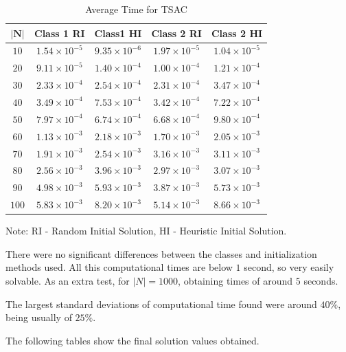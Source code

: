\documentclass[a4paper,12pt]{article}
\begin{document}
		
	\begin{table}[H]
		\centering
		\begin{tabular}{c|c|c|c|c}
			$ \mathbf{|N|}$ & \textbf{Class 1 RI}  & \textbf{Class1 HI}& \textbf{Class 2 RI} & \textbf{Class 2 HI}  \\ \hline
			$ 10  $			& $1.54\times10^{-5}$ & $9.35\times10^{-6}$& $1.97\times10^{-5}$ & $1.04\times10^{-5}$ \\ \hline
			$ 20  $			& $9.11\times10^{-5}$ & $1.40\times10^{-4}$& $1.00\times10^{-4}$ & $1.21\times10^{-4}$ \\ \hline
			$ 30  $			& $2.33\times10^{-4}$ & $2.54\times10^{-4}$& $2.31\times10^{-4}$ & $3.47\times10^{-4}$ \\ \hline
			$ 40  $			& $3.49\times10^{-4}$ & $7.53\times10^{-4}$& $3.42\times10^{-4}$ & $7.22\times10^{-4}$\\ \hline
			$ 50  $			& $7.97\times10^{-4}$ & $6.74\times10^{-4}$& $6.68\times10^{-4}$ & $9.80\times10^{-4}$ \\ \hline
			$ 60  $			& $1.13\times10^{-3}$ & $2.18\times10^{-3}$& $1.70\times10^{-3}$ & $2.05\times10^{-3}$ \\ \hline
			$ 70 $			& $1.91\times10^{-3}$ & $2.54\times10^{-3}$& $3.16\times10^{-3}$ & $3.11\times10^{-3}$\\ \hline
			$ 80 $			& $2.56\times10^{-3}$ & $3.96\times10^{-3}$& $2.97\times10^{-3}$ & $3.07\times10^{-3}$\\ \hline
			$ 90 $			& $4.98\times10^{-3}$ & $5.93\times10^{-3}$& $3.87\times10^{-3}$ & $5.73\times10^{-3}$\\ \hline
			$ 100 $			& $5.83\times10^{-3}$ & $8.20\times10^{-3}$& $5.14\times10^{-3}$ & $8.66\times10^{-3}$\\
		\end{tabular}
		\caption{Average Time for TSAC}
		\label{table:times2}
	\end{table}
	Note: RI - Random Initial Solution, HI - Heuristic Initial Solution.
	
	There were no significant differences between the classes and initialization methods used.
	All this computational times are below $ 1 $ second, so very easily solvable.
	As an extra test, for $ |N| = 1000 $, obtaining times of around $ 5 $ seconds.
	
	The largest standard deviations of computational time found were around $40\%$, being usually of $25\%$.
	
	The following tables show the final solution values obtained.
\end{document}

